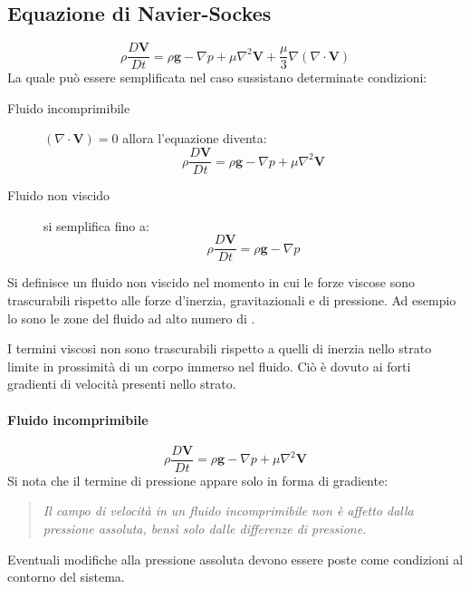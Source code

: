 \subsection{Equazione di Navier-Sockes}
\begin{equation}
\rho \frac{D\mathbf{V}}{Dt} = \rho \mathbf{g} - \nabla p + \mu \nabla^2\mathbf{V} + \frac{\mu}{3}\nabla(\nabla \cdot \mathbf{V})
\label{eqn:NavierStockes} 
\end{equation}
La quale può essere semplificata nel caso sussistano determinate condizioni:
\begin{description}
\item[Fluido incomprimibile] $(\nabla \cdot \mathbf{V}) = 0 $ allora l'equazione diventa:
\begin{equation}
\rho \frac{D\mathbf{V}}{Dt} = \rho \mathbf{g} - \nabla p + \mu \nabla^2\mathbf{V}
\end{equation}
\item[Fluido non viscido] si semplifica fino a:
\begin{equation}
\rho \frac{D\mathbf{V}}{Dt} = \rho \mathbf{g} - \nabla p
\end{equation}
\end{description}
Si definisce un fluido non viscido nel momento in cui le forze viscose sono trascurabili rispetto alle forze d'inerzia, gravitazionali e di pressione.
Ad esempio lo sono le zone del fluido ad alto numero di .

I termini viscosi non sono trascurabili rispetto a quelli di inerzia nello strato limite in prossimità di un corpo immerso nel fluido. Ciò è dovuto ai forti gradienti di velocità presenti nello strato.

\paragraph{Fluido incomprimibile}
\begin{equation}
\rho \frac{D\mathbf{V}}{Dt} = \rho \mathbf{g} - \nabla p + \mu \nabla^2\mathbf{V}
\end{equation}
Si nota che il termine di pressione appare solo in forma di gradiente:
\begin{quote}
\textit{Il campo di velocità in un fluido incomprimibile non è affetto dalla pressione assoluta, bensì solo dalle differenze di pressione.}
\end{quote}
Eventuali modifiche alla pressione assoluta devono essere poste come condizioni al contorno del sistema.

